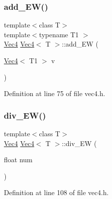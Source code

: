 \mbox{\label{class_vec4_a5b1357147d90b510db62a89bf700ed04}} 
\subsubsection{\texorpdfstring{add\_EW()}{add\_EW()}\hspace{0.1cm}{\footnotesize\ttfamily [2/2]}}
{\footnotesize\ttfamily template$<$class T$>$ \\
template$<$typename T1 $>$ \\
\mbox{\hyperlink{class_vec4}{Vec4}} \mbox{\hyperlink{class_vec4}{Vec4}}$<$ T $>$\+::add\+\_\+\+EW (\begin{DoxyParamCaption}\item[{\mbox{\hyperlink{class_vec4}{Vec4}}$<$ T1 $>$}]{v }\end{DoxyParamCaption})\hspace{0.3cm}{\ttfamily [inline]}}



Definition at line 75 of file vec4.\+h.

\mbox{\label{class_vec4_a7bf4bc251ed964206e88033102ec6ced}} 
\subsubsection{\texorpdfstring{div\_EW()}{div\_EW()}\hspace{0.1cm}{\footnotesize\ttfamily [1/2]}}
{\footnotesize\ttfamily template$<$class T$>$ \\
\mbox{\hyperlink{class_vec4}{Vec4}} \mbox{\hyperlink{class_vec4}{Vec4}}$<$ T $>$\+::div\+\_\+\+EW (\begin{DoxyParamCaption}\item[{float}]{num }\end{DoxyParamCaption})\hspace{0.3cm}{\ttfamily [inline]}}



Definition at line 108 of file vec4.\+h.

\mbox{\label{class_vec4_a75606102b31f71a2a8370608d517bf13}} 
